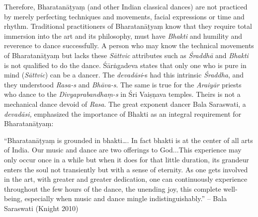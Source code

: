 Therefore, Bharatanāṭyaṃ (and other Indian classical dances) are not practiced by merely perfecting techniques and movements, facial expressions or time and rhythm. Traditional practitioners of Bharatanāṭyaṃ know that they require total immersion into the art and its philosophy, must have \textit{Bhakti} and humility and reverence to dance successfully. A person who may know the technical movements of Bharatanāṭyaṃ but lacks these \textit{Sāttvic} attributes such as \textit{Śraddhā} and \textit{Bhakti} is not qualified to do the dance. Śārṅgadeva states that only one who is pure in mind (\textit{Sāttvic}) can be a dancer. The \textit{devadāsi}-s had this intrinsic \textit{Śraddha}, and they understood \textit{Rasa-s} and\textit{ Bhāva-s}. The same is true for the \textit{Araiyār} priests who dance to the \textit{Divyaprabandhaṃ-s} in Śri Vaiṣṇava temples. Theirs is not a mechanical dance devoid of \textit{Rasa}. The great exponent dancer Bala Saraswati, a \textit{devadāsi,} emphasized the importance of Bhakti as an integral requirement for Bharatanāṭyaṃ:

\begin{myquote}
“Bharatanāṭyaṃ is grounded in bhakti…. In fact bhakti is at the center of all arts of India. Our music and dance are two offerings to God...This experience may only occur once in a while but when it does for that little duration, its grandeur enters the soul not transiently but with a sense of eternity. As one gets involved in the art, with greater and greater dedication, one can continuously experience throughout the few hours of the dance, the unending joy, this complete well-being, especially when music and dance mingle indistinguishably.” – Bala Saraswati (Knight 2010)
\end{myquote}

